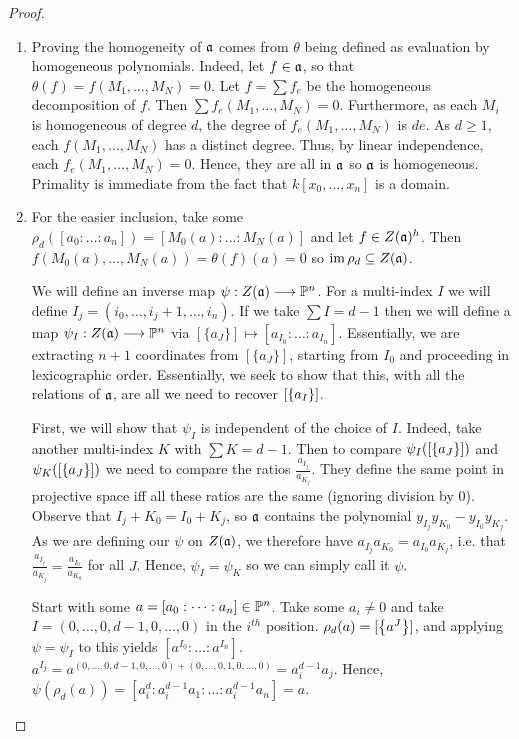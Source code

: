 \begin{proof}
    \begin{enumerate}[label = (\alph*)]
        \item Proving the homogeneity of $\a$ comes from $\theta$ being defined as evaluation by homogeneous polynomials. Indeed, let $f \in \a$, so that $\theta(f) = f(M_1, \dots, M_N) = 0$. Let $f = \sum f_e$ be the homogeneous decomposition of $f$. Then $\sum f_e(M_1, \dots, M_N) = 0$. Furthermore, as each $M_i$ is homogeneous of degree $d$, the degree of $f_e(M_1, \dots, M_N)$ is $de$. As $d \geq 1$, each $f(M_1, \dots, M_N)$ has a distinct degree. Thus, by linear independence, each $f_e(M_1, \dots, M_N) = 0$. Hence, they are all in $\a$ so $\a$ is homogeneous. Primality is immediate from the fact that $k[x_0, \dots, x_n]$ is a domain.

        \item For the easier inclusion, take some $\rho_d([a_0 : \dots : a_n]) = [M_0(a) : \dots : M_N(a)]$ and let $f \in Z(\a)^h$. Then $f(M_0(a), \dots, M_N(a)) = \theta(f)(a) = 0$ so $\im \rho_d \subseteq Z(\a)$. 

        We will define an inverse map $\psi: Z(\a) \longrightarrow \P^n$. For a multi-index $I$ we will define $I_j = (i_0, \dots, i_j + 1, \dots, i_n)$. If we take $\sum I = d - 1$ then we will define a map $\psi_I: Z(\a) \longrightarrow \P^n$ via $[\{a_J\}] \mapsto [a_{I_0} : \dots : a_{I_n}]$. Essentially, we are extracting $n + 1$ coordinates from $[\{a_J\}]$, starting from $I_0$ and proceeding in lexicographic order. Essentially, we seek to show that this, with all the relations of $\a$, are all we need to recover $[\curly{a_I}]$.

        First, we will show that $\psi_I$ is independent of the choice of $I$. Indeed, take another multi-index $K$ with $\sum K = d - 1$. Then to compare $\psi_I([\curly{a_J}])$ and $\psi_K([\curly{a_J}])$ we need to compare the ratios $\frac{a_{I_j}}{a_{K_j}}$. They define the same point in projective space iff all these ratios are the same (ignoring division by $0$). Observe that $I_j + K_0 = I_0 + K_j$, so $\a$ contains the polynomial $y_{I_j} y_{K_0} - y_{I_0} y_{K_j}$. As we are defining our $\psi$ on $Z(\a)$, we therefore have $a_{I_j} a_{K_0} = a_{I_0} a_{K_j}$, i.e. that $\frac{a_{I_j}}{a_{K_j}} = \frac{a_{I_0}}{a_{K_0}}$ for all $J$. Hence, $\psi_I = \psi_K$ so we can simply call it $\psi$.

        Start with some $a = [a_0 : \dots : a_n] \in \P^n$. Take some $a_i \neq 0$ and take $I = (0, \dots, 0, d - 1, 0, \dots, 0)$ in the $i^{th}$ position. $\rho_d(a) = [\curly{a^J}]$, and applying $\psi = \psi_I$ to this yields $[a^{I_0} : \dots : a^{I_n}]$. $a^{I_j} = a^{(0, \dots, 0, d - 1, 0, \dots, 0) + (0, \dots, 0, 1, 0, \dots, 0)} = a_i^{d - 1} a_j$. Hence, $\psi(\rho_d(a)) = [a_i^{d} : a_i^{d - 1} a_1 : \dots : a_i^{d - 1} a_n] = a$.


\end{enumerate}
\end{proof}
